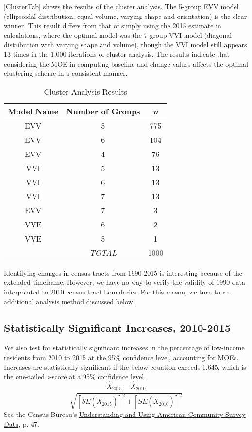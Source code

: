 \documentclass[paper=letterpaper, fontsize=11pt]{scrartcl}
\begin{document}
\autoref{ClusterTab} shows the results of the cluster analysis. The 5-group EVV model (ellipsoidal distribution, equal volume, varying shape and orientation) is the clear winner. This result differs from that of simply using the 2015 estimate in calculations, where the optimal model was the 7-group VVI model (diagonal distribution with varying shape and volume), though the VVI model still appears 13 times in the 1,000 iterations of cluster analysis. The results indicate that considering the MOE in computing baseline and change values affects the optimal clustering scheme in a consistent manner.

\begin{table}[h]
	\caption{Cluster Analysis Results}
	\label{ClusterTab}
	\centering
		\begin{tabular}{||c c c||} 
		\hline
		Model Name & Number of Groups & \textit{n} \\ [0.5ex] 
		\hline\hline
		EVV & 5 & 775 \\ 
		\hline
		EVV & 6 & 104 \\
		\hline
		EVV & 4 & 76 \\
		\hline
		VVI & 5 & 13 \\
		\hline
		VVI & 6 & 13 \\
		\hline
		VVI & 7 & 13 \\
		\hline
		EVV & 7 & 3 \\
		\hline
		VVE & 6 & 2 \\
		\hline
		VVE & 5 & 1 \\
		\hline \hline
		& \textit{TOTAL} & 1000 \\ [0.5ex] 
		\hline
	\end{tabular}
\end{table} 

Identifying changes in census tracts from 1990-2015 is interesting because of the extended timeframe. However, we have no way to verify the validity of 1990 data interpolated to 2010 census tract boundaries. For this reason, we turn to an additional analysis method discussed below. 

\subsection{Statistically Significant Increases, 2010-2015}
We also test for statistically significant increases in the percentage of low-income residents from 2010 to 2015 at the 95\% confidence level, accounting for MOEs. Increases are statistically significant if the below equation exceeds 1.645, which is the one-tailed \textit{z}-score at a 95\% confidence level.
\begin{equation}
\frac{\hat{X}_{2015}-\hat{X}_{2010}}{\sqrt{[SE(\hat{X}_{2015})]^2 + [SE(\hat{X}_{2010})]^2}}
\end{equation}
See the Census Bureau's \href{https://www.census.gov/content/dam/Census/library/publications/2018/acs/acs_general_handbook_2018.pdf}{Understanding and Using American Community Survey Data}, p. 47.
\end{document}
